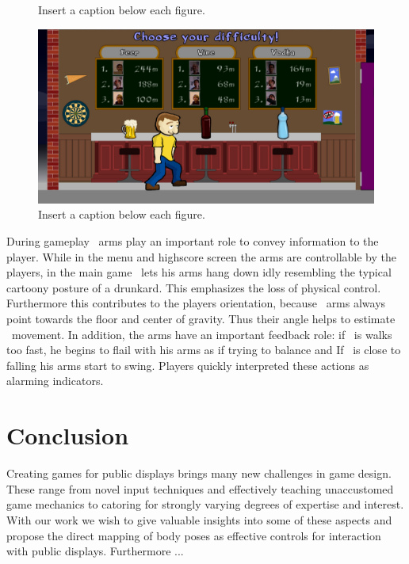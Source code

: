 \documentclass{chi-ext}
\begin{document}
{\begin{figure}
  \caption{Insert a caption below each figure.}
  \label{fig:screenshot3}
\end{figure}
\begin{figure}
  \centering
  \includegraphics[width=\linewidth]{pictures/screenshot2.jpg}
  \caption{Insert a caption below each figure.}
  \label{fig:screenshot4}
\end{figure}
}
During gameplay \eds\ arms play an important role to convey information to the player. While in the menu and highscore screen the arms are controllable by the players, in the main game \ed\ lets his arms hang down idly resembling the typical cartoony posture of a drunkard. This emphasizes the loss of physical control. Furthermore this contributes to the players orientation, because \eds\ arms always point towards the floor and center of gravity. Thus their angle helps to estimate \eds\ movement. In addition, the arms have an important feedback role: if \ed\ is walks too fast, he begins to flail with his arms as if trying to balance and If \ed\ is close to falling his arms start to swing. Players quickly interpreted these actions as alarming indicators.
%
\section{Conclusion}
%
Creating games for public displays brings many new challenges in game design. These range from novel input techniques and effectively teaching unaccustomed game mechanics to catoring for strongly varying degrees of expertise and interest. With our work we wish to give valuable insights into some of these aspects and propose the direct mapping of body poses as effective controls for interaction with public displays. Furthermore ...
\end{document}
